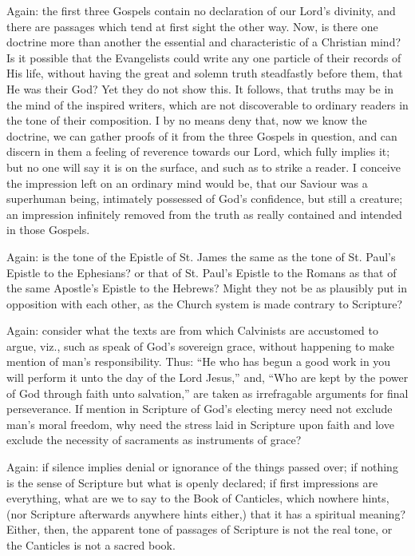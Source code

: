 Again: the first three Gospels contain no declaration of our Lord's
divinity, and there are passages which tend at first sight the other
way. Now, is there one doctrine more than another the essential and
characteristic of a Christian mind? Is it possible that the
Evangelists could write any one particle of their records of His life,
without having the great and solemn truth steadfastly before them,
that He was their God? Yet they do not show this. It follows, that
truths may be in the mind of the inspired writers, which are not
discoverable to ordinary readers in the tone of their composition. I
by no means deny that, now we know the doctrine, we can gather proofs
of it from the three Gospels in question, and can discern in them a
feeling of reverence towards our Lord, which fully implies it; but no
one will say it is on the surface, and such as to strike a reader. I
conceive the impression left on an ordinary mind would be, that our
Saviour was a superhuman being, intimately possessed of God's
confidence, but still a creature; an impression infinitely removed
from the truth as really contained and intended in those Gospels.

Again: is the tone of the Epistle of St. James the same as the tone
of St. Paul's Epistle to the Ephesians? or that of St. Paul's Epistle
to the Romans as that of the same Apostle's Epistle to the Hebrews?
Might they not be as plausibly put in opposition with each other, as
the Church system is made contrary to Scripture?

Again: consider what the texts are from which Calvinists are
accustomed to argue, viz., such as speak of God's sovereign grace,
without happening to make mention of man's responsibility. Thus:
``He who has begun a good work in you will perform it unto the day
of the Lord Jesus,'' and, ``Who are kept by the power of God
through faith unto salvation,'' are taken as irrefragable
arguments for final perseverance. If mention in Scripture of God's
electing mercy need not exclude man's moral freedom, why need the
stress laid in Scripture upon faith and love exclude the necessity of
sacraments as instruments of grace?

Again: if silence implies denial or ignorance of the things passed
over; if nothing is the sense of Scripture but what is openly
declared; if first impressions are everything, what are we to say to
the Book of Canticles, which nowhere hints, (nor Scripture afterwards
anywhere hints either,) that it has a spiritual meaning? Either, then,
the apparent tone of passages of Scripture is not the real tone, or
the Canticles is not a sacred book.

